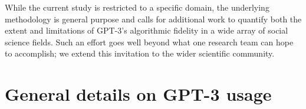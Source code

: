 \documentclass[11pt]{article}
\begin{document}
While the current study is restricted to a specific domain, the underlying methodology is general purpose and calls for additional work to quantify both the extent and limitations of GPT-3's algorithmic fidelity in a wide array of social science fields. Such an effort goes well beyond what one research team can hope to accomplish; we  extend this invitation to the wider scientific community. %









\appendix

\section{General details on GPT-3 usage}
\label{sec:gpt3usage}
\end{document}
